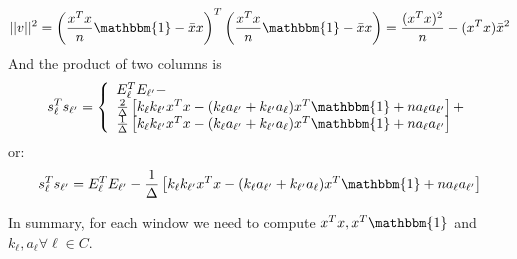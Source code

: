 \begin{equation}
    ||v||^{2} = \left(\frac{x^{T}x}{n}\mathbbm{1} - \bar{x}x\right)^{T}\left(\frac{x^{T}x}{n}\mathbbm{1} - \bar{x}x\right) = \frac{(x^{T}x)^{2}}{n} - (x^{T}x)\bar{x}^{2}
\end{equation}
And  the product of two columns is
\begin{equation}
    s_{\ell}^{T}s_{\ell'} =
    \left\lbrace\begin{array}{l}
        E_{\ell}^{T}E_{\ell'} -\\
        \frac{2}{\Delta}\left[k_{\ell}k_{\ell'}x^{T}x -(k_{\ell}a_{\ell'} +k_{\ell'}a_{\ell})x^{T}\mathbbm{1}+ n a_{\ell}a_{\ell'}\right]+\\
        \frac{1}{\Delta}\left[k_{\ell}k_{\ell'} x^{T}x - (k_{\ell}a_{\ell'}+k_{\ell'}a_{\ell})x^{T}\mathbbm{1} + n a_{\ell}a_{\ell'}\right]
    \end{array}\right.
\end{equation}
or:
\begin{equation}
    s_{\ell}^{T}s_{\ell'} = E_{\ell}^{T}E_{\ell'} - \frac{1}{\Delta}\left[k_{\ell}k_{\ell'}x^{T}x -(k_{\ell}a_{\ell'} +k_{\ell'}a_{\ell})x^{T}\mathbbm{1}+ n a_{\ell}a_{\ell'}\right]
\end{equation}

In summary, for each window we need to compute $x^{T}x, x^{T}\mathbbm{1}$ and $k_{\ell}, a_{\ell} \forall \ell\in C$.



